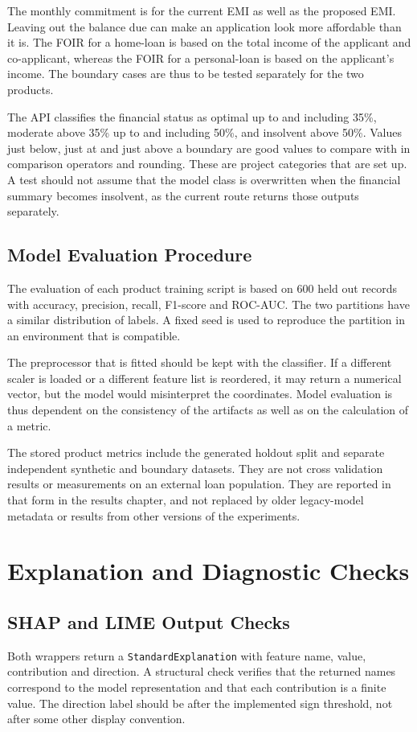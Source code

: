 The monthly commitment is for the current EMI as well as the proposed EMI. Leaving out the balance due can make an application look more affordable than it is. The FOIR for a home-loan is based on the total income of the applicant and co-applicant, whereas the FOIR for a personal-loan is based on the applicant's income. The boundary cases are thus to be tested separately for the two products.

The API classifies the financial status as optimal up to and including 35\%, moderate above 35\% up to and including 50\%, and insolvent above 50\%. Values just below, just at and just above a boundary are good values to compare with in comparison operators and rounding. These are project categories that are set up. A test should not assume that the model class is overwritten when the financial summary becomes insolvent, as the current route returns those outputs separately.

\subsection{Model Evaluation Procedure}
The evaluation of each product training script is based on 600 held out records with accuracy, precision, recall, F1-score and ROC-AUC. The two partitions have a similar distribution of labels. A fixed seed is used to reproduce the partition in an environment that is compatible.

The preprocessor that is fitted should be kept with the classifier. If a different scaler is loaded or a different feature list is reordered, it may return a numerical vector, but the model would misinterpret the coordinates. Model evaluation is thus dependent on the consistency of the artifacts as well as on the calculation of a metric.

The stored product metrics include the generated holdout split and separate independent synthetic and boundary datasets. They are not cross validation results or measurements on an external loan population. They are reported in that form in the results chapter, and not replaced by older legacy-model metadata or results from other versions of the experiments.

\section{Explanation and Diagnostic Checks}
\subsection{SHAP and LIME Output Checks}
Both wrappers return a \texttt{StandardExplanation} with feature name, value, contribution and direction. A structural check verifies that the returned names correspond to the model representation and that each contribution is a finite value. The direction label should be after the implemented sign threshold, not after some other display convention.


